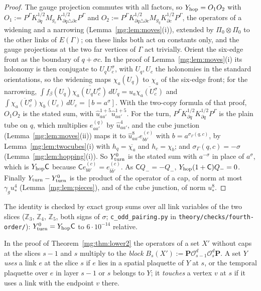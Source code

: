 \documentclass[11pt,a4paper]{article}
\theoremstyle{definition}
\theoremstyle{remark}
\begin{document}
\begin{proof}
The gauge projection commutes with all factors, so $Y_{\rm hop}=O_1O_2$ with $O_1:=P^\Gamma K^{1/2}_{\partial q}M_{g_c}K^{1/2}_{\partial q\triangle\partial c}P^\Gamma$ and
$O_2:=P^\Gamma K^{1/2}_{\partial q\triangle\partial c}M_{g_q}K^{1/2}_{\partial c}P^\Gamma$, the operators of a widening and a narrowing (Lemma~\ref{mg:lem:moves}(i)), extended by
$\Pi_0\otimes\Pi_0$ to the other links of $E(\Gamma)$; on these links both act on constants only, and the gauge projections at the two far vertices of $\Gamma$ act
trivially. Orient the six-edge front as the boundary of $q+\sigma c$. In the proof of Lemma~\ref{mg:lem:moves}(i) its holonomy is then conjugate to $U_qU_c^{\sigma}$, with $U_q,U_c$ the
holonomies in the standard orientations, so the widening maps $\chi_a(U_q)$ to $\chi_a$ of the six-edge front; for the narrowing,
$\int f_\beta(U_q)\overline{\chi_a(U_qU_c^\sigma)}\,dU_q=u_a\overline{\chi_a(U_c^\sigma)}$ and $\int\overline{\chi_a(U_c^\sigma)}\chi_b(U_c)\,dU_c=[b=a^\sigma]$. With the two-copy formula of that
proof, $O_1O_2$ is the stated sum, with $\hat u_{aa'}^{1+5}\hat u_{aa'}^{1+5}$. For the turn, $P^\Gamma K^{1/2}_{\partial q}K^{1/2}_{\partial q}P^\Gamma$ is the plain tube on $q$, which
multiplies $e^{(q)}_{aa'}$ by $\hat u_{aa'}^4$, and the cube junction (Lemma~\ref{mg:lem:moves}(ii)) maps it to $\hat u_{aa'}^{8}e^{(c)}_{bb'}$ with $b=a^{\sigma_\Gamma(q,c)}$, by
Lemma~\ref{mg:lem:twocubes}(i) with $h_q=\overline{\chi_a}$ and $h_c=\chi_b$; and $\sigma_\Gamma(q,c)=-\sigma$ (Lemma~\ref{mg:lem:hopping}(i)). So $Y^0_{\rm turn}$ is the
stated sum with $a^{-\sigma}$ in place of $a^\sigma$, which is $Y_{\rm hop}\mathsf C$ because $\mathsf Ce^{(c)}_{bb'}=e^{(c)}_{\bar b\bar b'}$. As $\mathsf CQ_-=-Q_-$, $Y_{\rm hop}(1+\mathsf C)Q_-=0$.
Finally $Y_{\rm turn}-Y^0_{\rm turn}$ is the product of the operator of a cap, of norm at most $\gamma_gu_*^4$ (Lemma~\ref{mg:lem:pieces}), and of the cube junction,
of norm $u_*^8$.
\end{proof}

The identity is checked by exact group sums over all link variables of the two slices ($\mathbb Z_3$, $\mathbb Z_4$, $\mathbb Z_5$, both signs of $\sigma$;
\texttt{c\_odd\_pairing.py} in \texttt{theory/checks/fourth-order/}): $Y^0_{\rm turn}=Y_{\rm hop}\mathsf C$ to $6\cdot10^{-14}$ relative.

In the proof of Theorem~\ref{mg:thm:lower2} the operators of a set $X'$ without caps at the slices $s-1$ and $s$ multiply to the \emph{block}
$B_{s}(X'):=\mathbf P\mathcal O^d_{s-1}\mathcal O^d_s\mathbf P$. A set $Y$ \emph{uses} a link $e$ at the slice $s$ if $e$ lies in a spatial plaquette of $Y$ at $s$,
or the temporal plaquette over $e$ in layer $s-1$ or $s$ belongs to $Y$; it \emph{touches} a vertex $v$ at $s$ if it uses a link with the endpoint $v$
there.
\end{document}
